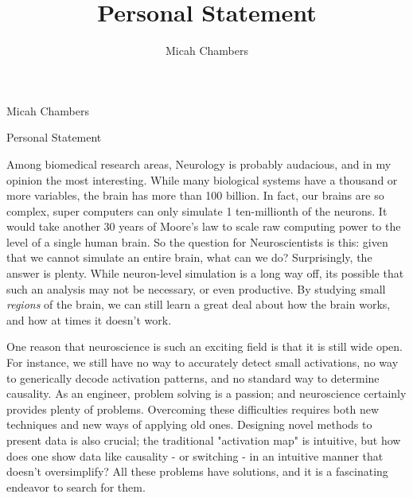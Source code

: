 \documentclass[12pt]{article}
\author{Micah Chambers}
\title{Personal Statement}
\begin{document}


\Large
\begin{multicols}{2}
\begin{flushleft}
Micah Chambers
\end{flushleft}

\begin{flushright}
Personal Statement
\end{flushright}
\end{multicols}
\normalsize

Among biomedical research areas, Neurology is probably
audacious, and in my opinion the most interesting. While many
biological systems have a thousand or more variables, the brain
has more than 100 billion. In fact, our brains are so complex, super
computers can only simulate
1 ten-millionth of the neurons. It would take another
30 years of Moore's law to scale raw computing
power to the level of a single human brain.
So the question for Neuroscientists is this: given that we cannot
simulate an entire brain, what can we do? Surprisingly, the answer is plenty.
While neuron-level simulation is a long way off,
its possible that such an analysis may not be necessary, or even
productive. By studying small \emph{regions} of the brain, 
we can still learn a great deal about how the brain
works, and how at times it doesn't work. 

One reason that neuroscience is such an
exciting field is that it is still wide open.
For instance, we still have no way to accurately
detect small activations, no way to generically
decode activation patterns, and no standard
way to determine causality. As an engineer, problem solving
is a passion; and neuroscience certainly provides plenty of problems.
Overcoming these difficulties requires both new techniques
and new ways of applying old ones.  Designing novel methods to present
data is also crucial; the traditional "activation map" is intuitive, 
but how does one show data like causality
- or switching - in an intuitive manner that doesn't 
oversimplify? All these
problems have solutions, and it is a fascinating
endeavor to search for them. 
\end{document}
